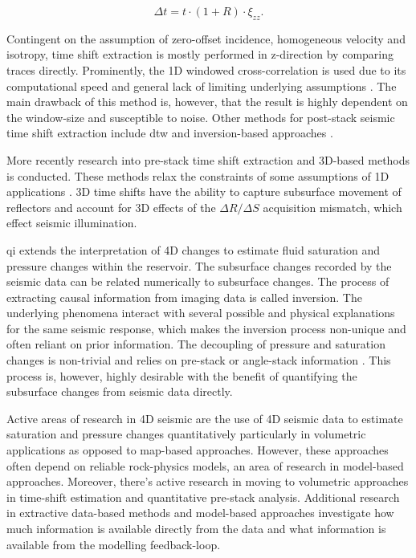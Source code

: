 \begin{equation}
    \Delta t = t \cdot (1 + R) \cdot \xi_{zz}.
\end{equation}

Contingent on the assumption of zero-offset incidence, homogeneous velocity and isotropy, time shift extraction is mostly performed in z-direction by comparing traces directly. Prominently, the 1D windowed cross-correlation is used due to its computational speed and general lack of limiting underlying assumptions \citep{Rickett2001-nx}. The main drawback of this method is, however, that the result is highly dependent on the window-size and susceptible to noise. Other methods for post-stack seismic time shift extraction include \ac{dtw} \citep{Hale2013} and inversion-based approaches \citep{Rickett2007-yo}. 

More recently research into pre-stack time shift extraction and 3D-based methods is conducted. These methods relax the constraints of some assumptions of 1D applications \citep{ghaderi2005pre, hall2002time}. 3D time shifts have the ability to capture subsurface movement of reflectors and account for 3D effects of the $\Delta R / \Delta S$ acquisition mismatch, which effect seismic illumination.

\acf{qi} extends the interpretation of 4D changes to estimate fluid saturation and pressure changes within the reservoir. The subsurface changes recorded by the seismic data can be related numerically to subsurface changes. The process of extracting causal information from imaging data is called inversion. The underlying phenomena interact with several possible and physical explanations for the same seismic response, which makes the inversion process non-unique and often reliant on prior information. The decoupling of pressure and saturation changes is non-trivial and relies on pre-stack or angle-stack information \citep{Landro2001-rz}. This process is, however, highly desirable with the benefit of quantifying the subsurface changes from seismic data directly.

Active areas of research in 4D seismic are the use of 4D seismic data to estimate saturation and pressure changes quantitatively particularly in volumetric applications as opposed to map-based approaches. However, these approaches often depend on reliable rock-physics models, an area of research in model-based approaches. Moreover, there's active research in moving to volumetric approaches in time-shift estimation and quantitative pre-stack analysis. Additional research in extractive data-based methods and model-based approaches investigate how much information is available directly from the data and what information is available from the modelling feedback-loop.